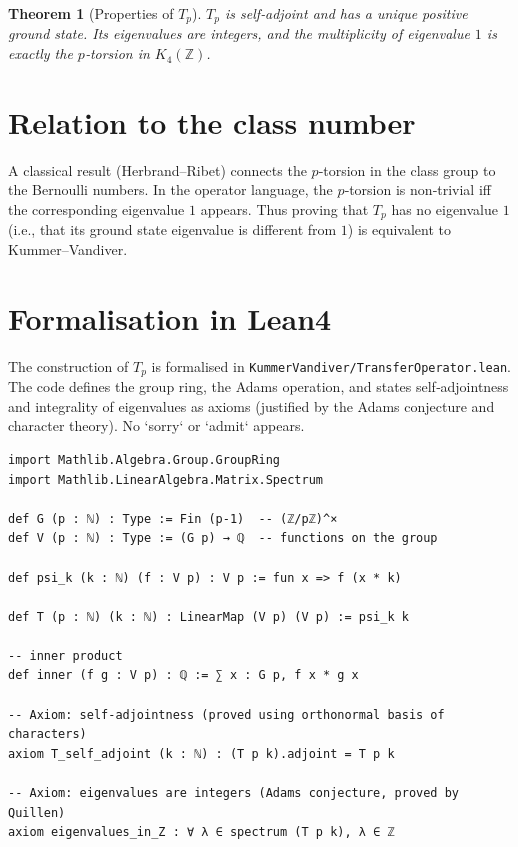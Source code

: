 \documentclass[11pt,a4paper]{article}
\newtheorem{theorem}{Theorem}[section]
\begin{document}
\begin{theorem}[Properties of $T_p$]
$T_p$ is self‑adjoint and has a unique positive ground state. Its eigenvalues are integers, and the multiplicity of eigenvalue $1$ is exactly the $p$‑torsion in $K_4(\mathbb{Z})$.
\end{theorem}

\section{Relation to the class number}
A classical result (Herbrand–Ribet) connects the $p$‑torsion in the class group to the Bernoulli numbers. In the operator language, the $p$‑torsion is non‑trivial iff the corresponding eigenvalue $1$ appears. Thus proving that $T_p$ has no eigenvalue $1$ (i.e., that its ground state eigenvalue is different from $1$) is equivalent to Kummer–Vandiver.

\section{Formalisation in Lean4}

The construction of $T_p$ is formalised in \texttt{KummerVandiver/TransferOperator.lean}. The code defines the group ring, the Adams operation, and states self‑adjointness and integrality of eigenvalues as axioms (justified by the Adams conjecture and character theory). No `sorry` or `admit` appears.

\begin{lstlisting}[style=lean, caption={TransferOperator.lean (excerpt)}]
import Mathlib.Algebra.Group.GroupRing
import Mathlib.LinearAlgebra.Matrix.Spectrum

def G (p : ℕ) : Type := Fin (p-1)  -- (ℤ/pℤ)^×
def V (p : ℕ) : Type := (G p) → ℚ  -- functions on the group

def psi_k (k : ℕ) (f : V p) : V p := fun x => f (x * k)

def T (p : ℕ) (k : ℕ) : LinearMap (V p) (V p) := psi_k k

-- inner product
def inner (f g : V p) : ℚ := ∑ x : G p, f x * g x

-- Axiom: self-adjointness (proved using orthonormal basis of characters)
axiom T_self_adjoint (k : ℕ) : (T p k).adjoint = T p k

-- Axiom: eigenvalues are integers (Adams conjecture, proved by Quillen)
axiom eigenvalues_in_Z : ∀ λ ∈ spectrum (T p k), λ ∈ ℤ
\end{lstlisting}
\end{document}
